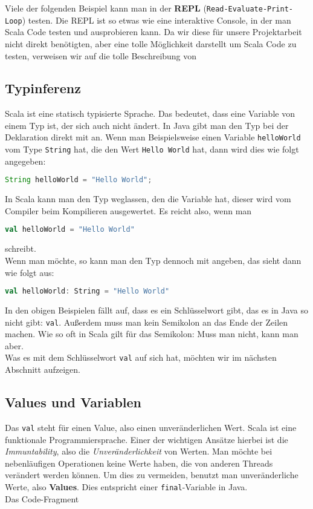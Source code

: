 Viele der folgenden Beispiel kann man in der \textbf{REPL} (\texttt{Read-Evaluate-Print-Loop}) testen. Die REPL ist so etwas wie eine interaktive Console, in der man Scala Code testen und ausprobieren kann. Da wir diese für unsere Projektarbeit nicht direkt benötigten, aber eine tolle Möglichkeit darstellt um Scala Code zu testen, verweisen wir auf die tolle Beschreibung von \cite{GettingStartedWithTheScalaREPL}

\subsection{Typinferenz}
Scala ist eine statisch typisierte Sprache. Das bedeutet, dass eine Variable von einem Typ ist, der sich auch nicht ändert. In Java gibt man den Typ bei der Deklaration direkt mit an. Wenn man Beispielsweise einen Variable \texttt{helloWorld} vom Type \texttt{String} hat, die den Wert \texttt{Hello World} hat, dann wird dies wie folgt angegeben:

\begin{lstlisting}[language=Java,numbers=none]
String helloWorld = "Hello World";
\end{lstlisting}

In Scala kann man den Typ weglassen, den die Variable hat, dieser wird vom Compiler beim Kompilieren ausgewertet. Es reicht also, wenn man

\begin{lstlisting}[language=Scala,numbers=none]
val helloWorld = "Hello World"
\end{lstlisting}

schreibt.\\
Wenn man möchte, so kann man den Typ dennoch mit angeben, das sieht dann wie folgt aus:

\begin{lstlisting}[language=Scala,numbers=none]
val helloWorld: String = "Hello World"
\end{lstlisting}

In den obigen Beispielen fällt auf, dass es ein Schlüsselwort gibt, das es in Java so nicht gibt: \texttt{val}. Außerdem muss man kein Semikolon an das Ende der Zeilen machen. Wie so oft in Scala gilt für das Semikolon: Muss man nicht, kann man aber.\\
Was es mit dem Schlüsselwort \texttt{val} auf sich hat, möchten wir im nächsten Abschnitt aufzeigen.

\subsection{Values und Variablen}
Das \texttt{val} steht für einen Value, also einen unveränderlichen Wert. Scala ist eine funktionale Programmiersprache. Einer der wichtigen Ansätze hierbei ist die \textit{Immuntability}, also die \textit{Unveränderlichkeit} von Werten. Man möchte bei nebenläufigen Operationen keine Werte haben, die von anderen Threads verändert werden können. Um dies zu vermeiden, benutzt man unveränderliche Werte, also \textbf{Values}. Dies entspricht einer \texttt{final}-Variable in Java.\\
Das Code-Fragment

